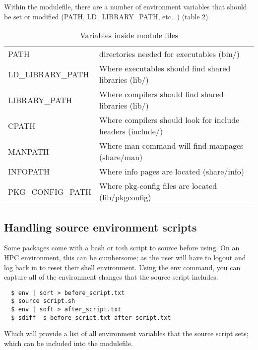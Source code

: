 \documentclass{article}
\begin{document}
Within the modulefile, there are a number of environment variables that should 
be set or modified (PATH, LD\_LIBRARY\_PATH, etc...) (table 2).

\begin{table}[h]
		\begin{tabular}{ll}
				PATH & directories needed for executables (bin/)\\
				LD\_LIBRARY\_PATH & Where executables should find shared libraries (lib/) \\
				LIBRARY\_PATH & Where compilers should find shared libraries (lib/)\\
				CPATH & Where compilers should look for include headers (include/) \\
				MANPATH & Where man command will find manpages (share/man) \\
				INFOPATH & Where info pages are located (share/info) \\
				PKG\_CONFIG\_PATH & Where pkg-config files are located (lib/pkgconfig) \\
		\end{tabular}
		\caption {Variables inside module files}
\end{table}


\subsection{Handling source environment scripts}

Some packages come with a bash or tcsh script to source before using.  On an 
HPC environment, this can be cumbersome; as the user will have to logout and 
log back in to reset their shell environment.  Using the env command, you can 
capture all of the environment changes that the source script includes.

\begin{verbatim}
  $ env | sort > before_script.txt
  $ source script.sh
  $ env | soft > after_script.txt
  $ sdiff -s before_script.txt after_script.txt
\end{verbatim}

\noindent Which will provide a list of all environment variables that the 
source script sets; which can be included into the modulefile.
\end{document}

